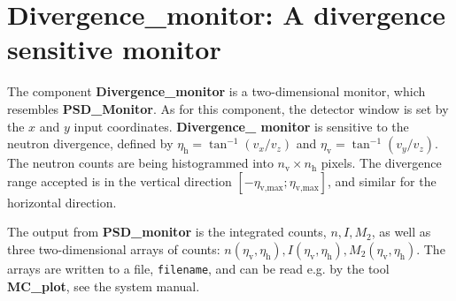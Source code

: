 
\section{Divergence\_monitor: A divergence sensitive monitor}
\label{s:div-monitor}

The component \textbf{Divergence\_monitor} is a two-dimensional monitor,
which resembles \textbf{PSD\_Monitor}. As for this component,
the detector window is set
by the $x$ and $y$ input coordinates.
\textbf{Divergence\_ monitor} is sensitive to the neutron divergence,
defined by
$\eta_\textrm{h} = \tan^{-1}(v_x/v_z)$ and $\eta_\textrm{v} = \tan^{-1}(v_y/v_z)$.
The neutron counts are being histogrammed
into $n_\textrm{v} \times n_\textrm{h}$ pixels. 
The divergence range accepted is in the vertical direction
$[-\eta_\textrm{v,max}; \eta_\textrm{v,max}]$, and similar for the horizontal
direction.

The output from \textbf{PSD\_monitor} is the integrated counts, $n, I, M_2$,
as well as
three two-dimensional arrays of counts: $n(\eta_\textrm{v},\eta_\textrm{h}),
I(\eta_\textrm{v},\eta_\textrm{h}), M_2(\eta_\textrm{v},\eta_\textrm{h})$.
The arrays are written to a file, \verb+filename+, 
and can be read e.g. by the tool \textbf{MC\_plot}, see the system manual.
